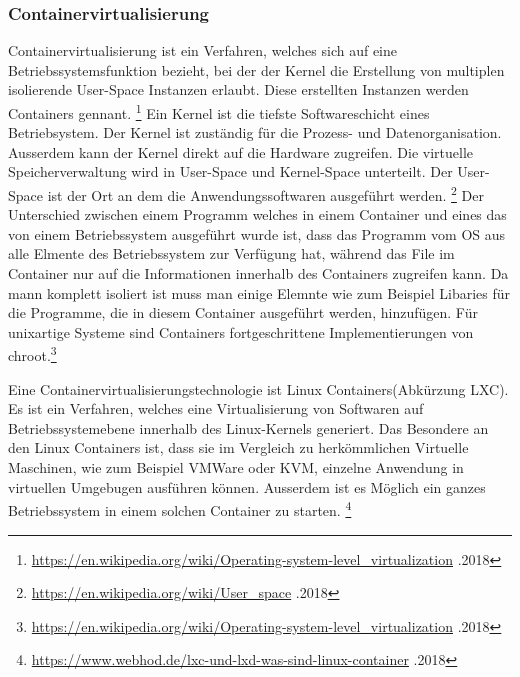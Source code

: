 \documentclass[10pt]{article}
\begin{document}
	\subsubsection{Containervirtualisierung}
	Containervirtualisierung ist ein Verfahren, welches sich auf eine Betriebssystemsfunktion bezieht, bei der der Kernel die Erstellung von multiplen isolierende User-Space Instanzen erlaubt. Diese erstellten Instanzen werden Containers gennant. \footnote{\label{foot:4} \href{https://en.wikipedia.org/wiki/Operating-system-level_virtualization}{https://en.wikipedia.org/wiki/Operating-system-level_virtualization} .2018} 
Ein Kernel ist die tiefste Softwareschicht eines Betriebsystem. Der Kernel ist zuständig für die Prozess- und Datenorganisation. Ausserdem kann der Kernel direkt auf die Hardware zugreifen.
Die virtuelle Speicherverwaltung wird in User-Space und Kernel-Space unterteilt. Der User-Space ist der Ort an dem die  Anwendungssoftwaren ausgeführt werden. \footnote{\label{foot:6} \href{https://en.wikipedia.org/wiki/User_space}{https://en.wikipedia.org/wiki/User_space} .2018} 
Der Unterschied zwischen einem Programm welches in einem Container und eines das von einem Betriebssystem ausgeführt wurde ist, dass das Programm vom OS aus alle Elmente des Betriebssystem zur Verfügung hat, während das File im Container nur auf die Informationen innerhalb des Containers zugreifen kann. Da mann komplett isoliert ist muss man einige Elemnte wie zum Beispiel Libaries für die Programme, die in diesem Container ausgeführt werden, hinzufügen. 
Für unixartige Systeme sind Containers fortgeschrittene Implementierungen von chroot.\footnote{\label{foot:4} \href{https://en.wikipedia.org/wiki/Operating-system-level_virtualization}{https://en.wikipedia.org/wiki/Operating-system-level_virtualization} .2018} 
	
	Eine Containervirtualisierungstechnologie ist Linux Containers(Abkürzung LXC). Es ist ein Verfahren, welches eine Virtualisierung von Softwaren auf Betriebssystemebene innerhalb des Linux-Kernels generiert. 
Das Besondere an den Linux Containers ist, dass sie im Vergleich zu herkömmlichen Virtuelle Maschinen, wie zum Beispiel VMWare oder KVM, einzelne Anwendung in virtuellen Umgebugen ausführen können. Ausserdem ist es Möglich ein ganzes Betriebssystem in einem solchen Container zu starten.  \footnote{\label{foot:5} \href{https://www.webhod.de/lxc-und-lxd-was-sind-linux-container}{https://www.webhod.de/lxc-und-lxd-was-sind-linux-container} .2018}  
\pagebreak
\end{document}
